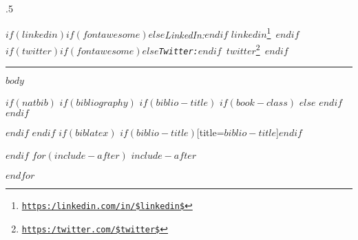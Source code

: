 \documentclass[$if(fontsize)$$fontsize$,$endif$$if(lang)$$babel-lang$,$endif$$if(papersize)$$papersize$paper,$endif$$for(classoption)$$classoption$$sep$,$endfor$]{$documentclass$}
\renewcommand{\href}[2]{#2\footnote{\url{#1}}}
\begin{document}
\moveleft.5\hoffset\centerline{ $if(linkedin)$$if(fontawesome)$\faLinkedIn \hspace{1 mm}$else$\emph{LinkedIn:}$endif$ \href{https:/linkedin.com/in/$linkedin$}{\tt $linkedin$} \hspace{1 mm} $endif$ $if(twitter)$$if(fontawesome)$\faTwitter \hspace{1 mm}$else$\emph{Twitter:}$endif$ \href{https:/twitter.com/$twitter$}{\tt $twitter$} $endif$}

\vspace{2 mm}

\hrule

\vspace{2 mm}

\pagestyle{regular} %

$body$

$if(natbib)$
$if(bibliography)$
$if(biblio-title)$
$if(book-class)$
\renewcommand\bibname{$biblio-title$}
$else$
\renewcommand\refname{$biblio-title$}
$endif$
$endif$


$endif$
$endif$
$if(biblatex)$
\printbibliography$if(biblio-title)$[title=$biblio-title$]$endif$

$endif$
$for(include-after)$
$include-after$

$endfor$
\end{document}
